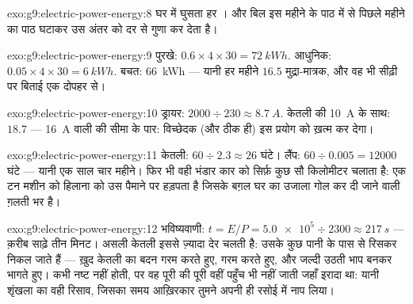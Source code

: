 \begin{solution}{exo:g9:electric-power-energy:8}
घर में घुसता हर । और बिल इस महीने के पाठ में से पिछले महीने
का पाठ घटाकर उस अंतर को दर से गुणा कर देता है।
\end{solution}

\begin{solution}{exo:g9:electric-power-energy:9}
पुरखे: $0.6 \times 4 \times 30 = \qty{72}{kWh}$. आधुनिक: $0.05 \times
4 \times 30 = \qty{6}{kWh}$. बचत: \qty{66}{kWh} --- यानी हर महीने
$16.5$ मुद्रा-मात्रक, और वह भी सीढ़ी पर बिताई एक दोपहर से।
\end{solution}

\begin{solution}{exo:g9:electric-power-energy:10}
ड्रायर: $2000 \div 230 \approx \qty{8.7}{A}$. केतली की \qty{10}{A}
के साथ: $18.7$ --- \qty{16}{A} वाली  की सीमा के पार: विच्छेदक
(और ठीक ही) इस प्रयोग को ख़त्म कर देगा।
\end{solution}

\begin{solution}{exo:g9:electric-power-energy:11}
केतली: $60 \div 2.3 \approx 26$ घंटे। लैंप: $60 \div 0.005 = 12000$
घंटे --- यानी एक साल चार महीने। फिर भी वही भंडार कार को सिर्फ़ कुछ सौ
किलोमीटर चलाता है: एक टन मशीन को हिलाना  को उस पैमाने पर हड़पता
है जिसके बग़ल घर का उजाला गोल कर दी जाने वाली ग़लती भर है।
\end{solution}

\begin{solution}{exo:g9:electric-power-energy:12}
भविष्यवाणी: $t = E/P = \num{5.0e5} \div 2300 \approx \qty{217}{s}$
--- क़रीब साढ़े तीन मिनट। असली केतली इससे ज़्यादा देर चलती है:
उसके कुछ  पानी के पास से रिसकर निकल जाते हैं --- ख़ुद केतली का बदन
गरम करते हुए,  गरम करते हुए, और जल्दी उठती भाप बनकर भागते हुए।
 कभी नष्ट नहीं होती, पर वह पूरी की पूरी वहीं पहुँच भी नहीं जाती
जहाँ इरादा था: यानी शृंखला का वही रिसाव, जिसका समय आख़िरकार तुमने अपनी
ही रसोई में नाप लिया।
\end{solution}

